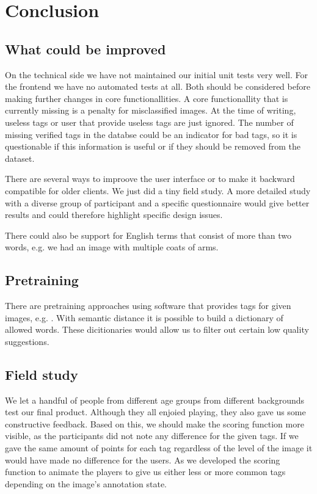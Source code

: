 \section{Conclusion}
\label{g1:sec:conclusion}

\subsection{What could be improved}
\label{g1:sec:conclusion:improved}
On the technical side we have not maintained our initial unit tests very well. For the frontend we have no automated tests at all. Both should be considered before making further changes in core functionallities.
A core functionallity that is currently missing is a penalty for misclassified images. At the time of writing, useless tags or user that provide useless tags are just ignored. The number of missing verified tags in the databse could be an indicator for bad tags, so it is questionable if this information is useful or if they should be removed from the dataset.

There are several ways to improove the user interface or to make it backward compatible for older clients. We just did a tiny field study. A more detailed study with a diverse group of participant and a specific questionnaire would give better results and could therefore highlight specific design issues.

There could also be support for English terms that consist of more than two words, e.g. we had an image with multiple coats of arms.

\subsection{Pretraining}
\label{g14:sec:conclusion:pretraining}
There are pretraining approaches using software that provides tags for given images, e.g. \cite{simonyan2014very}. With semantic distance it is possible to build a dictionary of allowed words. These dicitionaries would allow us to filter out certain low quality suggestions.

\subsection{Field study}
\label{g1:sec:conclusion:fieldstudy}
We let a handful of people from different age  groups from different backgrounds test our final product.
Although they all enjoied playing, they also gave us some constructive feedback.
Based on this, we should make the scoring function more visible, as the participants did not note any difference for the given tags.
If we gave the same amount of points for each tag regardless of the level of the image it would have made no difference for the users.
As we developed the scoring function to animate the players to give us either less or more common tags depending on the image's annotation state.

